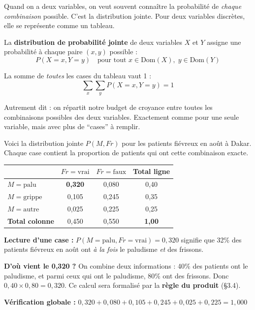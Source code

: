 \documentclass[11pt,a4paper]{article}
\newcommand{\cmark}{\ding{51}}
\begin{document}
Quand on a deux variables, on veut souvent connaître la probabilité de \textit{chaque combinaison} possible. C'est la distribution jointe. Pour deux variables discrètes, elle se représente comme un tableau.

\begin{definitionbox}
La \textbf{distribution de probabilité jointe} de deux variables $X$ et $Y$ assigne une probabilité à chaque paire $(x, y)$ possible :
$$P(X = x, Y = y) \quad \text{pour tout } x \in \text{Dom}(X), \; y \in \text{Dom}(Y)$$

La somme de \textit{toutes} les cases du tableau vaut 1 :
$$\sum_{x}\sum_{y} P(X=x, Y=y) = 1$$

Autrement dit  : on répartit notre budget de croyance entre toutes les combinaisons possibles des deux variables. Exactement comme pour une seule variable, mais avec plus de ``cases'' à remplir.
\end{definitionbox}

\begin{exemplebox}
Voici la distribution jointe $P(M, Fr)$ pour les patients fiévreux en août à Dakar. Chaque case contient la proportion de patients qui ont cette combinaison exacte.

\begin{center}
\begin{tabular}{l|cc|c}
\toprule
 & $Fr = \text{vrai}$ & $Fr = \text{faux}$ & \textbf{Total ligne} \\
\midrule
$M = \text{palu}$ & \textbf{0,320} & 0,080 & 0,40 \\
$M = \text{grippe}$ & 0,105 & 0,245 & 0,35 \\
$M = \text{autre}$ & 0,025 & 0,225 & 0,25 \\
\midrule
\textbf{Total colonne} & 0,450 & 0,550 & \textbf{1,00} \\
\bottomrule
\end{tabular}
\end{center}

\textbf{Lecture d'une case :} $P(M = \text{palu}, Fr = \text{vrai}) = 0{,}320$ signifie que 32\% des patients fiévreux en août ont \textit{à la fois} le paludisme \textit{et} des frissons.

\textbf{D'où vient le 0,320 ?} On combine deux informations : 40\% des patients ont le paludisme, et parmi ceux qui ont le paludisme, 80\% ont des frissons. Donc $0{,}40 \times 0{,}80 = 0{,}320$. Ce calcul sera formalisé par la \textbf{règle du produit} (§3.4).

\textbf{Vérification globale :} $0{,}320 + 0{,}080 + 0{,}105 + 0{,}245 + 0{,}025 + 0{,}225 = 1{,}000$ \cmark
\end{exemplebox}
\end{document}
